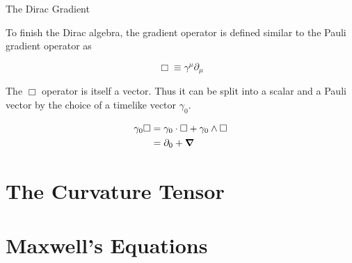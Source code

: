 \documentclass{beamer}
\begin{document}
\begin{frame}{The Dirac Gradient}

To finish the Dirac algebra, the gradient operator is defined similar to the Pauli gradient operator as

\begin{equation}
	\Box \equiv \gamma^\mu\partial_\mu
\end{equation}

\pause

The $\Box$ operator is itself a vector. Thus it can be split into a scalar and a Pauli vector by the choice of a timelike vector $\gamma_0$.

\begin{align*}
	\gamma_0\Box &= \gamma_0\cdot \Box + \gamma_0 \wedge \Box \\
	&= \partial_0 + \grad
\end{align*}

\end{frame}

\section{The Curvature Tensor}

\section{Maxwell's Equations}
\end{document}
